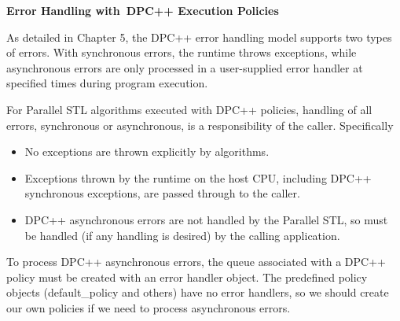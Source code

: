 \hspace*{\fill} \par %
\textbf{Error Handling with DPC++ Execution Policies}

As detailed in Chapter 5, the DPC++ error handling model supports two types of errors. With synchronous errors, the runtime throws exceptions, while asynchronous errors are only processed in a user-supplied error handler at specified times during program execution.\par

For Parallel STL algorithms executed with DPC++ policies, handling of all errors, synchronous or asynchronous, is a responsibility of the caller. Specifically\par

\begin{itemize}
	\item No exceptions are thrown explicitly by algorithms.
	\item Exceptions thrown by the runtime on the host CPU, including DPC++ synchronous exceptions, are passed through to the caller.
	\item DPC++ asynchronous errors are not handled by the Parallel STL, so must be handled (if any handling is desired) by the calling application.
\end{itemize}

To process DPC++ asynchronous errors, the queue associated with a DPC++ policy must be created with an error handler object. The predefined policy objects (default\_policy and others) have no error handlers, so we should create our own policies if we need to process asynchronous errors.\par


































